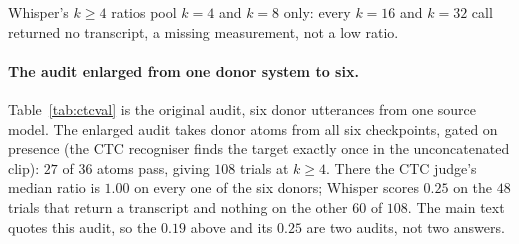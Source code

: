 \noindent Whisper's $k\ge4$ ratios pool $k{=}4$ and $k{=}8$ only: every $k{=}16$ and $k{=}32$ call returned no
transcript, a missing measurement, not a low ratio.

\paragraph{The audit enlarged from one donor system to six.}
Table~\ref{tab:ctcval} is the original audit, six donor utterances from one source model. The enlarged audit takes
donor atoms from all six checkpoints, gated on presence (the CTC recogniser finds the target exactly once in the
unconcatenated clip): $27$ of $36$ atoms pass, giving $108$ trials at $k\ge4$. There the CTC judge's median ratio is
$1.00$ on every one of the six donors; Whisper scores $0.25$ on the $48$ trials that return a transcript and nothing
on the other $60$ of $108$. The main text quotes this audit, so the $0.19$ above and its $0.25$ are two audits, not
two answers.

